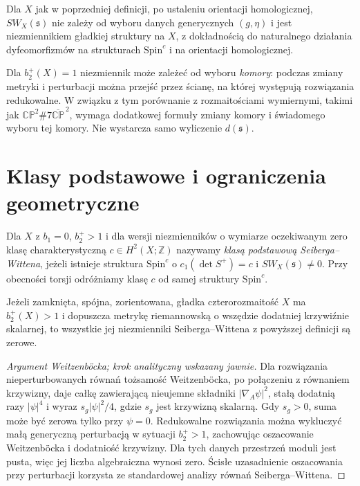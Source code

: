 \begin{twierdzenie}
Dla $X$ jak w poprzedniej definicji, po ustaleniu
orientacji homologicznej, $SW_X(\mathfrak s)$ nie zależy
od wyboru danych generycznych $(g,\eta)$ i jest
niezmiennikiem gładkiej struktury na $X$, z dokładnością
do naturalnego działania dyfeomorfizmów na strukturach
$\mathrm{Spin}^c$ i na orientacji homologicznej.
\end{twierdzenie}

\begin{uwaga}[Przypadek $b_2^+=1$]
Dla $b_2^+(X)=1$ niezmiennik może zależeć od wyboru
\emph{komory}: podczas zmiany metryki i perturbacji
można przejść przez ścianę, na której występują
rozwiązania redukowalne. W związku z tym porównanie
z rozmaitościami wymiernymi, takimi jak
$\mathbb{CP}^2\#7\overline{\mathbb{CP}}^{\,2}$,
wymaga dodatkowej formuły zmiany komory i świadomego
wyboru tej komory. Nie wystarcza samo wyliczenie
$d(\mathfrak s)$.
\end{uwaga}

\section{Klasy podstawowe i ograniczenia geometryczne}
\label{sec:tg-sw-basic}

\begin{definicja}
Dla $X$ z $b_1=0$, $b_2^+>1$ i dla wersji
niezmienników o wymiarze oczekiwanym zero klasę
charakterystyczną $c\in H^2(X;\mathbb Z)$
nazywamy \emph{klasą podstawową Seiberga--Wittena},
jeżeli istnieje struktura $\mathrm{Spin}^c$ o
$c_1(\det S^+)=c$ i $SW_X(\mathfrak s)\ne0$.
Przy obecności torsji odróżniamy klasę $c$ od samej
struktury $\mathrm{Spin}^c$.
\end{definicja}

\begin{twierdzenie}
\label{thm:tg-sw-psc}
Jeżeli zamknięta, spójna, zorientowana,
gładka czterorozmaitość $X$ ma $b_2^+(X)>1$
i dopuszcza metrykę riemannowską o wszędzie dodatniej
krzywiźnie skalarnej, to wszystkie jej niezmienniki
Seiberga--Wittena z powyższej definicji są zerowe.
\end{twierdzenie}

\begin{proof}[Argument Weitzenböcka; krok analityczny wskazany jawnie]
Dla rozwiązania nieperturbowanych równań tożsamość
Weitzenböcka, po połączeniu z równaniem krzywizny,
daje całkę zawierającą nieujemne składniki
$|\nabla_A\psi|^2$, stałą dodatnią razy $|\psi|^4$
i wyraz $s_g|\psi|^2/4$, gdzie $s_g$ jest krzywizną
skalarną. Gdy $s_g>0$, suma może być zerowa tylko
przy $\psi=0$. Redukowalne rozwiązania można wykluczyć
małą generyczną perturbacją w sytuacji $b_2^+>1$,
zachowując oszacowanie Weitzenböcka i dodatniość krzywizny.
Dla tych danych przestrzeń moduli jest pusta, więc
jej liczba algebraiczna wynosi zero.
Ścisłe uzasadnienie oszacowania przy perturbacji
korzysta ze standardowej analizy równań Seiberga--Wittena.
\end{proof}

